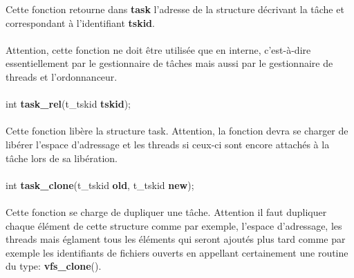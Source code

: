 \documentclass[10pt,a4wide]{article}
\begin{document}
Cette fonction retourne dans \textbf{task} l'adresse de la structure
d\'ecrivant la t\^ache et correspondant \`a l'identifiant \textbf{tskid}.

\paragraph{}

Attention, cette fonction ne doit \^etre utilis\'ee que en interne,
c'est-\`a-dire essentiellement par le gestionnaire de t\^aches mais aussi
par le gestionnaire de threads et l'ordonnanceur.

\paragraph{}

\hspace{1.5cm}int \textbf{task\_rel}(t\_tskid \textbf{tskid});

\paragraph{}

Cette fonction lib\`ere la structure task. Attention, la fonction
devra se charger de lib\'erer l'espace d'adressage et les threads
si ceux-ci sont encore attach\'es \`a la t\^ache lors de sa lib\'eration.

\paragraph{}

\hspace{1.5cm}int \textbf{task\_clone}(t\_tskid \textbf{old},
                                       t\_tskid \textbf{new});

\paragraph{}

Cette fonction se charge de dupliquer une t\^ache. Attention il faut dupliquer
chaque \'el\'ement de cette structure comme par exemple, l'espace d'adressage,
les threads mais \'eglament tous les \'el\'ements qui seront ajout\'es plus
tard comme par exemple les identifiants de fichiers ouverts en appellant
certainement une routine du type: \textbf{vfs\_clone}().

\paragraph{}
\end{document}
